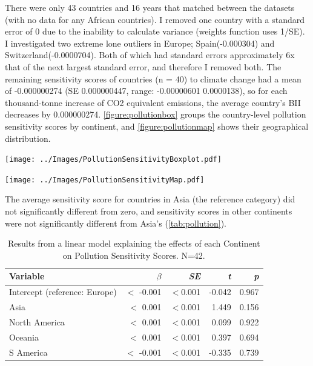 \documentclass[11pt, a4paper, titlepage]{article}
\begin{document}
	There were only 43 countries and 16 years that matched between the datasets (with no data for any African countries). I removed one country with a standard error of 0 due to the inability to calculate variance (weights function uses 1/SE). I investigated two extreme lone outliers in Europe; Spain(-0.000304) and Switzerland(-0.0000704). Both of which had standard errors approximately 6x that of the next largest standard error, and therefore I removed both. The remaining sensitivity scores of countries (n = 40) to climate change had a mean of -0.000000274 (SE 0.000000447, range: -0.00000601  0.0000138), so for each thousand-tonne increase of CO2 equivalent emissions, the average country's BII decreases by 0.000000274. \autoref{figure:pollutionbox} groups the country-level pollution sensitivity scores by continent, and \autoref{figure:pollutionmap} shows their geographical distribution. 

	\begin{center}
		
		\texttt{[image: ../Images/PollutionSensitivityBoxplot.pdf]}
		\label{figure:pollutionbox}
		
		\texttt{[image: ../Images/PollutionSensitivityMap.pdf]}
		\label{figure:pollutionmap}
		

	\end{center}
	The average sensitivity score for countries in Asia (the reference category) did not significantly different from zero, and sensitivity scores in other continents were not significantly different from Asia's (\autoref{tab:pollution}).
	
		\begin{table}[H]
		\begin{center}
			\caption{Results from a linear model explaining the effects of each Continent on Pollution Sensitivity Scores. \textmd{ N=42.}}
			\label{tab:pollution}
			\begin{tabular}{l|r|r|r|r} %
				Variable & $\beta$ & \textit{SE} & \textit{t} & \textit{p}\\
				\hline
				Intercept (reference: Europe) & $<$ -0.001 & $<$0.001 & -0.042 & 0.967\\
				Asia & $<$ 0.001 & $<$0.001 & 1.449 & 0.156 \\
				North America & $<$ 0.001 & $<$0.001 & 0.099 & 0.922\\
				Oceania & $<$ 0.001 & $<$0.001 & 0.397 & 0.694\\
				S America & $<$ -0.001 & $<$0.001 & -0.335 & 0.739\\
			\end{tabular}
		\end{center}
	\end{table}
\end{document}
